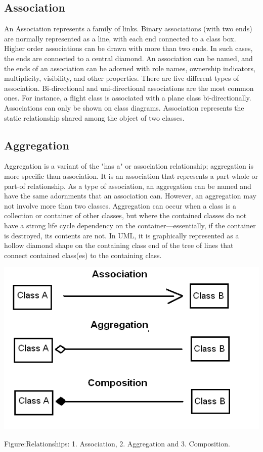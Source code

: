 \documentclass[10pt]{article}
\begin{document}
\subsection{Association}
An Association represents a family of links. Binary associations (with two ends) are normally represented as a line, with each end connected to a class box. Higher order associations can be
drawn with more than two ends. In such cases, the ends are connected to a central diamond.
\vskip10pt%
\noindent
An association can be named, and the ends of an association can be adorned with role names, ownership indicators,
multiplicity, visibility, and other properties. There are five different types of association. Bi-directional and
uni-directional associations are the most common ones. For instance, a flight class is associated with a plane class
bi-directionally. Associations can only be shown on class diagrams. Association represents the static relationship
shared among the object of two classes.
\subsection{Aggregation}
Aggregation is a variant of the "has a" or
association relationship; aggregation is more specific than association. It is an association
that represents a part-whole or part-of relationship. As a type of association, an
aggregation can be named and have the same adornments that an association can. However, an aggregation may not
involve more than two classes.
\vskip10pt%
\noindent
Aggregation can occur when a class is a collection or container of other classes, but where the contained classes do
not have a strong life cycle dependency on the container—essentially, if the container is destroyed, its contents are
not.
\vskip10pt%
\noindent
In UML, it is graphically represented as a hollow diamond shape on the containing class end of the tree of lines that
connect contained class(es) to the containing class.
\vskip18pt%

\includegraphics[width=1\textwidth,height=0.30\textheight ,inner]{bfBSY.png}\\
\begin{center}
 Figure:Relationships: 1. Association, 2. Aggregation and 3. Composition. 
\end{center}
\end{document}
